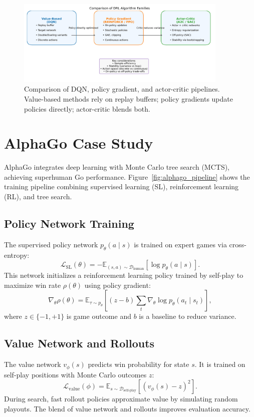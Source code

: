 \documentclass{article}
\begin{document}
\begin{figure}[H]
  \centering
  \includegraphics[width=0.9\textwidth]{rl_overview.png}
  \caption{Comparison of DQN, policy gradient, and actor-critic pipelines. Value-based methods rely on replay buffers; policy gradients update policies directly; actor-critic blends both.}
  \label{fig:rl_overview}
\end{figure}
\FloatBarrier

\section{AlphaGo Case Study}
AlphaGo integrates deep learning with Monte Carlo tree search (MCTS), achieving superhuman Go performance. Figure~\ref{fig:alphago_pipeline} shows the training pipeline combining supervised learning (SL), reinforcement learning (RL), and tree search.

\subsection{Policy Network Training}
The supervised policy network $p_{\theta}(a \mid s)$ is trained on expert games via cross-entropy:
\begin{equation}
  \mathcal{L}_{\text{SL}}(\theta) = -\mathbb{E}_{(s, a) \sim \mathcal{D}_{\text{human}}} [\log p_{\theta}(a \mid s)].
\end{equation}
This network initializes a reinforcement learning policy trained by self-play to maximize win rate $\rho(\theta)$ using policy gradient:
\begin{equation}
  \nabla_{\theta} \rho(\theta) = \mathbb{E}_{\tau \sim p_{\theta}} \left[ \left( z - b \right) \sum_{t} \nabla_{\theta} \log p_{\theta}(a_t \mid s_t) \right],
\end{equation}
where $z \in \{-1, +1\}$ is game outcome and $b$ is a baseline to reduce variance.

\subsection{Value Network and Rollouts}
The value network $v_{\phi}(s)$ predicts win probability for state $s$. It is trained on self-play positions with Monte Carlo outcomes $z$:
\begin{equation}
  \mathcal{L}_{\text{value}}(\phi) = \mathbb{E}_{s \sim \mathcal{D}_{\text{self-play}}} \left[ \left( v_{\phi}(s) - z \right)^2 \right].
\end{equation}
During search, fast rollout policies approximate value by simulating random playouts. The blend of value network and rollouts improves evaluation accuracy.
\end{document}

